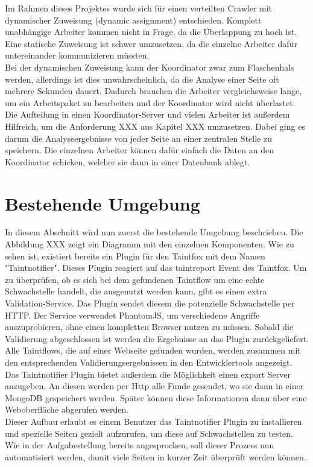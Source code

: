 Im Rahmen dieses Projektes wurde sich für einen verteilten Crawler mit dynamischer Zuweisung (dynamic assignment) entschieden. Komplett unabhängige Arbeiter kommen nicht in Frage, da die Überlappung zu hoch ist. Eine statische Zuweisung ist schwer umzusetzen, da die einzelne Arbeiter dafür untereinander kommunizieren müssten. \\
Bei der dynamischen Zuweisung kann der Koordinator zwar zum Flaschenhals werden, allerdings ist dies unwahrscheinlich, da die Analyse einer Seite oft mehrere Sekunden dauert. Dadurch brauchen die Arbeiter vergleichsweise lange, um ein Arbeitspaket zu bearbeiten und der Koordinator wird nicht überlastet. \\
Die Aufteilung in einen Koordinator-Server und vielen Arbeiter ist außerdem Hilfreich, um die Anforderung XXX aus Kapitel XXX umzusetzen. Dabei ging es darum die Analyseergebnisse von jeder Seite an einer zentralen Stelle zu speichern. Die einzelnen Arbeiter können dafür einfach die Daten an den Koordinator schicken, welcher sie dann in einer Datenbank ablegt.

\section{Bestehende Umgebung}
In diesem Abschnitt wird nun zuerst die bestehende Umgebung beschrieben. Die Abbildung XXX zeigt ein Diagramm mit den einzelnen Komponenten. Wie zu sehen ist, existiert bereits ein Plugin für den Taintfox mit dem Namen "Taintnotifier". Dieses Plugin reagiert auf das taintreport Event des Taintfox. Um zu überprüfen, ob es sich bei dem gefundenen Taintflow um eine echte Schwachstelle handelt, die ausgenutzt werden kann, gibt es einen extra Validation-Service. Das Plugin sendet diesem die potenzielle Schwachstelle per HTTP. Der Service verwendet PhantomJS, um verschiedene Angriffe auszuprobieren, ohne einen kompletten Browser nutzen zu müssen. Sobald die Validierung abgeschlossen ist werden die Ergebnisse an das Plugin zurückgeliefert. Alle Taintflows, die auf einer Webseite gefunden wurden, werden zusammen mit den entsprechenden Validierungsergebnissen in den Entwicklertools angezeigt. \\
Das Taintnotifier Plugin bietet außerdem die Möglichkeit einen export Server anzugeben. An diesen werden per Http alle Funde gesendet, wo sie dann in einer MongoDB gespeichert werden. Später können diese Informationen dann über eine Weboberfläche abgerufen werden. \\
Dieser Aufbau erlaubt es einem Benutzer das Taintnotifier Plugin zu installieren und spezielle Seiten gezielt aufzurufen, um diese auf Schwachstellen zu testen. Wie in der Aufgabestellung bereits angesprochen, soll dieser Prozess nun automatisiert werden, damit viele Seiten in kurzer Zeit überprüft werden können.

